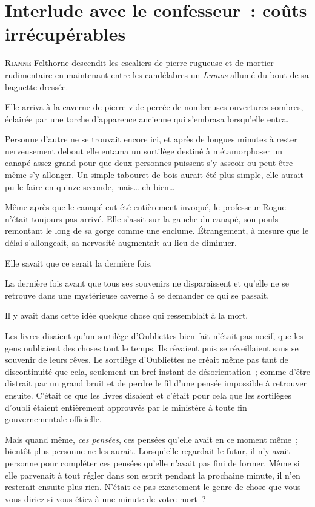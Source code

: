 \chapter{Interlude avec le confesseur~: coûts irrécupérables}

\lettrine{R}{ianne} Felthorne descendit les escaliers de pierre rugueuse et de mortier rudimentaire en maintenant entre les candélabres un \emph{Lumos} allumé du bout de sa baguette dressée.

Elle arriva à la caverne de pierre vide percée de nombreuses ouvertures sombres, éclairée par une torche d'apparence ancienne qui s'embrasa lorsqu'elle entra.

Personne d'autre ne se trouvait encore ici, et après de longues minutes à rester nerveusement debout elle entama un sortilège destiné à métamorphoser un canapé assez grand pour que deux personnes puissent s'y asseoir ou peut-être même s'y allonger.
Un simple tabouret de bois aurait été plus simple, elle aurait pu le faire en quinze seconde, mais… eh bien…

Même après que le canapé eut été entièrement invoqué, le professeur Rogue n'était toujours pas arrivé.
Elle s'assit sur la gauche du canapé, son pouls remontant le long de sa gorge comme une enclume.
Étrangement, à mesure que le délai s'allongeait, sa nervosité augmentait au lieu de diminuer.

Elle savait que ce serait la dernière fois.

La dernière fois avant que tous ses souvenirs ne disparaissent et qu'elle ne se retrouve dans une mystérieuse caverne à se demander ce qui se passait.

Il y avait dans cette idée quelque chose qui ressemblait à la mort.

Les livres disaient qu'un sortilège d'Oubliettes bien fait n'était pas nocif, que les gens oubliaient des choses tout le temps.
Ils rêvaient puis se réveillaient sans se souvenir de leurs rêves.
Le sortilège d'Oubliettes ne créait même pas tant de discontinuité que cela, seulement un bref instant de désorientation~; comme d'être distrait par un grand bruit et de perdre le fil d'une pensée impossible à retrouver ensuite.
C'était ce que les livres disaient et c'était pour cela que les sortilèges d'oubli étaient entièrement approuvés par le ministère à toute fin gouvernementale officielle.

Mais quand même, \emph{ces pensées}, ces pensées qu'elle avait en ce moment même~; bientôt plus personne ne les aurait.
Lorsqu'elle regardait le futur, il n'y avait personne pour compléter ces pensées qu'elle n'avait pas fini de former.
Même si elle parvenait à tout régler dans son esprit pendant la prochaine minute, il n'en resterait ensuite plus rien.
N'était-ce pas exactement le genre de chose que vous vous diriez si vous étiez à une minute de votre mort~?

